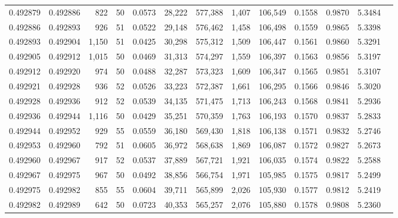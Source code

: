\begin{tabular}{rrrrrrrrrrrrr}
0.492879 & 0.492886 &   822 &  50 &                                     0.0573 &  28,222 & 577,388 &   1,407 & 106,549 & 0.1558 & 0.9870 & 5.3484 \\
0.492886 & 0.492893 &   926 &  51 &                                     0.0522 &  29,148 & 576,462 &   1,458 & 106,498 & 0.1559 & 0.9865 & 5.3398 \\
0.492893 & 0.492904 & 1,150 &  51 &                                     0.0425 &  30,298 & 575,312 &   1,509 & 106,447 & 0.1561 & 0.9860 & 5.3291 \\
0.492905 & 0.492912 & 1,015 &  50 &                                     0.0469 &  31,313 & 574,297 &   1,559 & 106,397 & 0.1563 & 0.9856 & 5.3197 \\
0.492912 & 0.492920 &   974 &  50 &                                     0.0488 &  32,287 & 573,323 &   1,609 & 106,347 & 0.1565 & 0.9851 & 5.3107 \\
0.492921 & 0.492928 &   936 &  52 &                                     0.0526 &  33,223 & 572,387 &   1,661 & 106,295 & 0.1566 & 0.9846 & 5.3020 \\
0.492928 & 0.492936 &   912 &  52 &                                     0.0539 &  34,135 & 571,475 &   1,713 & 106,243 & 0.1568 & 0.9841 & 5.2936 \\
0.492936 & 0.492944 & 1,116 &  50 &                                     0.0429 &  35,251 & 570,359 &   1,763 & 106,193 & 0.1570 & 0.9837 & 5.2833 \\
0.492944 & 0.492952 &   929 &  55 &                                     0.0559 &  36,180 & 569,430 &   1,818 & 106,138 & 0.1571 & 0.9832 & 5.2746 \\
0.492953 & 0.492960 &   792 &  51 &                                     0.0605 &  36,972 & 568,638 &   1,869 & 106,087 & 0.1572 & 0.9827 & 5.2673 \\
0.492960 & 0.492967 &   917 &  52 &                                     0.0537 &  37,889 & 567,721 &   1,921 & 106,035 & 0.1574 & 0.9822 & 5.2588 \\
0.492967 & 0.492975 &   967 &  50 &                                     0.0492 &  38,856 & 566,754 &   1,971 & 105,985 & 0.1575 & 0.9817 & 5.2499 \\
0.492975 & 0.492982 &   855 &  55 &                                     0.0604 &  39,711 & 565,899 &   2,026 & 105,930 & 0.1577 & 0.9812 & 5.2419 \\
0.492982 & 0.492989 &   642 &  50 &                                     0.0723 &  40,353 & 565,257 &   2,076 & 105,880 & 0.1578 & 0.9808 & 5.2360 \\

\end{tabular}
